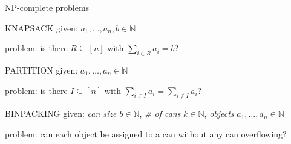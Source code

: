 \documentclass{beamer}
\theoremstyle{definition}
\begin{document}
\begin{frame}{NP-complete problems}

\begin{block}{KNAPSACK}
given: $a_1,\ldots,a_n,b \in \mathbb{N}$\par
problem: is there $R \subseteq [n]$ with $\sum_{i \in R} a_i = b$?
\end{block}\pause

\begin{block}{PARTITION}
given: $a_1,\ldots,a_n \in \mathbb{N}$\par
problem: is there $I \subseteq [n]$ with $\sum_{i \in I} a_i = \sum_{i \not\in I} a_i$?
\end{block}\pause

\begin{block}{BINPACKING}
given: \textit{can size} $b \in \mathbb{N}$, \textit{\# of cans} $k \in \mathbb{N}$, \textit{objects} $a_1,\ldots,a_n \in \mathbb{N}$\par
problem: can each object be assigned to a can without any can overflowing?
\end{block}

\end{frame}



\end{document}
